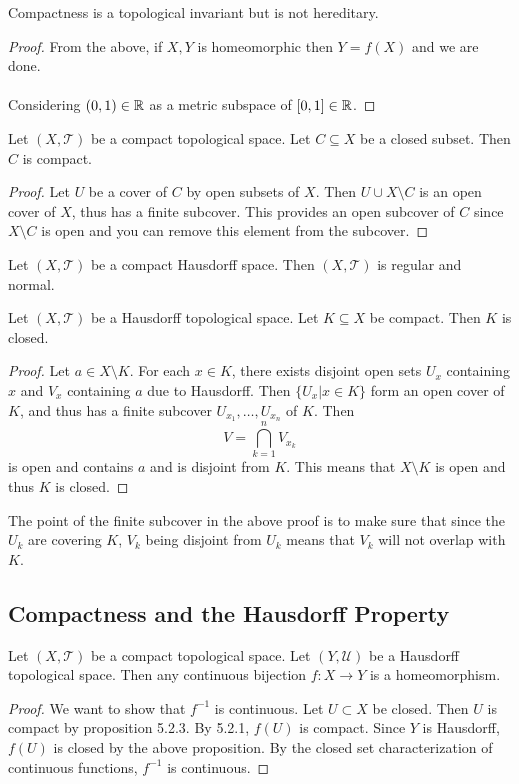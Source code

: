 \documentclass[a4paper]{article}
\begin{document}
\begin{lmm}{}{} Compactness is a topological invariant but is not hereditary. \tcbline
\begin{proof}
From the above, if $X,Y$ is homeomorphic then $Y=f(X)$ and we are done. \\~\\
Considering $(0,1)\in\mathbb{R}$ as a metric subspace of $[0,1]\in\mathbb{R}$. 
\end{proof}
\end{lmm}

\begin{prp}{}{} Let $(X,\mathcal{T})$ be a compact topological space. Let $C\subseteq X$ be a closed subset. Then $C$ is compact. \tcbline
\begin{proof}
Let $U$ be a cover of $C$ by open subsets of $X$. Then $U\cup X\setminus C$ is an open cover of $X$, thus has a finite subcover. This provides an open subcover of $C$ since $X\setminus C$ is open and you can remove this element from the subcover. 
\end{proof}
\end{prp}

\begin{prp}{}{} Let $(X,\mathcal{T})$ be a compact Hausdorff space. Then $(X,\mathcal{T})$ is regular and normal. 
\end{prp}

\begin{prp}{}{} Let $(X,\mathcal{T})$ be a Hausdorff topological space. Let $K\subseteq X$ be compact. Then $K$ is closed. \tcbline
\begin{proof}
Let $a\in X\setminus K$. For each $x\in K$, there exists disjoint open sets $U_x$ containing $x$ and $V_x$ containing $a$ due to Hausdorff. Then $\{U_x|x\in K\}$ form an open cover of $K$, and thus has a finite subcover $U_{x_1},\dots,U_{x_n}$ of $K$. Then $$V=\bigcap_{k=1}^nV_{x_k}$$ is open and contains $a$ and is disjoint from $K$. This means that $X\setminus K$ is open and thus $K$ is closed. 
\end{proof}
\end{prp}

The point of the finite subcover in the above proof is to make sure that since the $U_k$ are covering $K$, $V_k$ being disjoint from $U_k$ means that $V_k$ will not overlap with $K$. 

\subsection{Compactness and the Hausdorff Property}
\begin{prp}{}{} Let $(X,\mathcal{T})$ be a compact topological space. Let $(Y,\mathcal{U})$ be a Hausdorff topological space. Then any continuous bijection $f:X\to Y$ is a homeomorphism. \tcbline
\begin{proof}
We want to show that $f^{-1}$ is continuous. Let $U\subset X$ be closed. Then $U$ is compact by proposition 5.2.3. By 5.2.1, $f(U)$ is compact. Since $Y$ is Hausdorff, $f(U)$ is closed by the above proposition. By the closed set characterization of continuous functions, $f^{-1}$ is continuous. 
\end{proof}
\end{prp}
\end{document}
